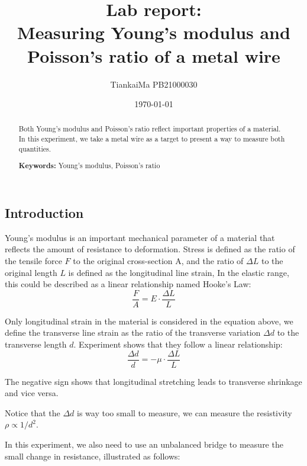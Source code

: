 \documentclass[a4paper]{article}
\title{Lab report:\\ Measuring Young's modulus and Poisson's ratio of a metal wire}
\author{TiankaiMa PB21000030}
\date{\today}
\begin{document}
\begin{multicols*}{2}
    \maketitle
    \begin{abstract}
        Both Young's modulus and Poisson's ratio reflect important properties of a material. In this experiment, we take a metal wire as a target to present a way to measure both quantities.
        \par
        \textbf{Keywords:} Young's modulus, Poisson's ratio
    \end{abstract}
    \section*{Introduction}

    Young's modulus is an important mechanical parameter of a material that reflects the amount of resistance to deformation. Stress is defined as the ratio of the tensile force $F$ to the original cross-section A, and the ratio of $\Delta L$ to the original length $L$ is defined as the longitudinal line strain, In the elastic range, this could be described as a linear relationship named Hooke's Law:
    \begin{equation}
        \dfrac{F}{A} = E\cdot\dfrac{\Delta L}{L}
    \end{equation}

    Only longitudinal strain in the material is considered in the equation above, we define the transverse line strain as the ratio of the transverse variation $\Delta d$ to the transverse length $d$. Experiment shows that they follow a linear relationship:
    \begin{equation}
        \dfrac{\Delta d}{d} = -\mu\cdot\dfrac{\Delta L}{L}
    \end{equation}

    The negative sign shows that longitudinal stretching leads to transverse shrinkage and vice versa.

    Notice that the $\Delta d$ is way too small to measure, we can measure the resistivity $\rho\propto 1/d^2$.

    In this experiment, we also need to use an unbalanced bridge to measure the small change in resistance, illustrated as follows:


\end{multicols*}
\end{document}
